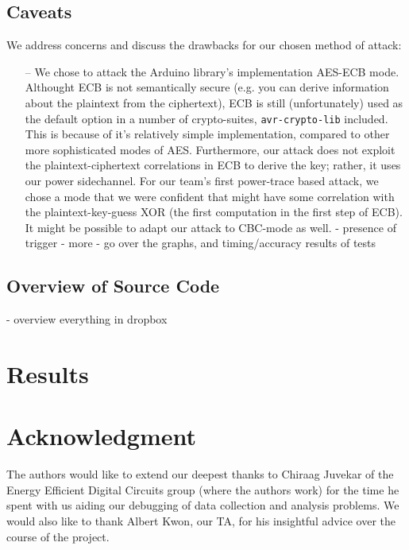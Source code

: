 \documentclass[journal]{ieee_style}
\begin{document}
\subsection{Caveats}
We address concerns and discuss the drawbacks for our chosen method of attack:
\begin{itemize}
    \item[--] We chose to attack the Arduino library's implementation AES-ECB mode. Althought ECB is not semantically secure (e.g. you can derive information about the plaintext from the ciphertext), ECB is still (unfortunately) used as the default option in a number of crypto-suites, \texttt{avr-crypto-lib} included. This is because of it's relatively simple implementation, compared to other more sophisticated modes of AES. Furthermore, our attack does not exploit the plaintext-ciphertext correlations in ECB to derive the key; rather, it uses our power sidechannel. For our team's first power-trace based attack, we chose a mode that we were confident that might have some correlation with the plaintext-key-guess XOR (the first computation in the first step of ECB). It might be possible to adapt our attack to CBC-mode as well.
- presence of trigger
- more
- go over the graphs, and timing/accuracy results of tests
\end{itemize}
\subsection{Overview of Source Code}
- overview everything in dropbox

\section{Results}



\section*{Acknowledgment}
The authors would like to extend our deepest thanks to Chiraag Juvekar of the Energy Efficient Digital Circuits group (where the authors work) for the time he spent with us aiding our debugging of data collection and analysis problems. We would also like to thank Albert Kwon, our TA, for his insightful advice over the course of the project.
\end{document}
